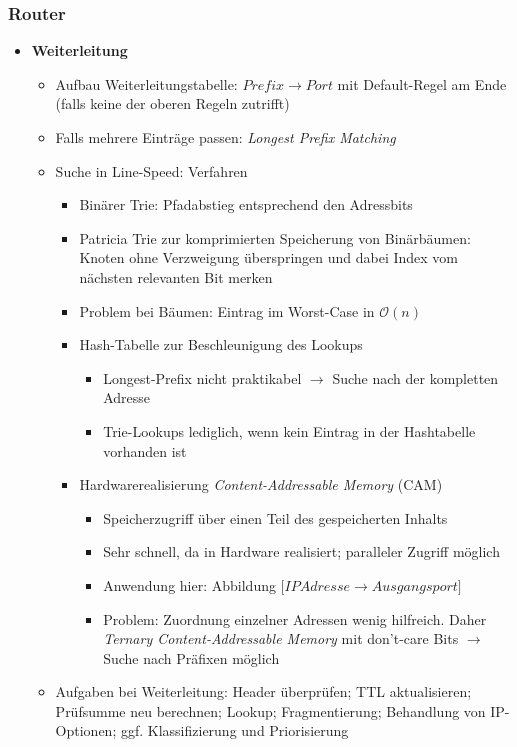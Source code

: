 \subsubsection{Router}
\begin{itemize}
	\item \textbf{Weiterleitung}
	\begin{itemize}
		\item Aufbau Weiterleitungstabelle: \(Prefix \rightarrow Port\) mit Default-Regel am Ende (falls keine der oberen Regeln zutrifft)
		\item Falls mehrere Einträge passen: \textit{Longest Prefix Matching}
		\item Suche in Line-Speed: Verfahren
		\begin{itemize}
			\item Binärer Trie: Pfadabstieg entsprechend den Adressbits
			\item Patricia Trie zur komprimierten Speicherung von Binärbäumen: Knoten ohne Verzweigung überspringen und dabei Index vom nächsten relevanten Bit merken
			\item Problem bei Bäumen: Eintrag im Worst-Case in \(\mathcal{O}(n)\)
			\item Hash-Tabelle zur Beschleunigung des Lookups
			\begin{itemize}
				\item Longest-Prefix nicht praktikabel \(\rightarrow\) Suche nach der kompletten Adresse
				\item Trie-Lookups lediglich, wenn kein Eintrag in der Hashtabelle vorhanden ist
			\end{itemize}
			\item Hardwarerealisierung \textit{Content-Addressable Memory} (CAM)
			\begin{itemize}
				\item Speicherzugriff über einen Teil des gespeicherten Inhalts
				\item Sehr schnell, da in Hardware realisiert; paralleler Zugriff möglich
				\item Anwendung hier: Abbildung \(\big\lbrack IPAdresse \rightarrow Ausgangsport\big\rbrack\)
				\item Problem: Zuordnung einzelner Adressen wenig hilfreich. Daher \textit{Ternary Content-Addressable Memory} mit don't-care Bits \(\rightarrow\) Suche nach Präfixen möglich
			\end{itemize}
		\end{itemize}
		\item Aufgaben bei Weiterleitung: Header überprüfen; TTL aktualisieren; Prüfsumme neu berechnen; Lookup; Fragmentierung; Behandlung von IP-Optionen; ggf. Klassifizierung und Priorisierung

\end{itemize}
\end{itemize}
